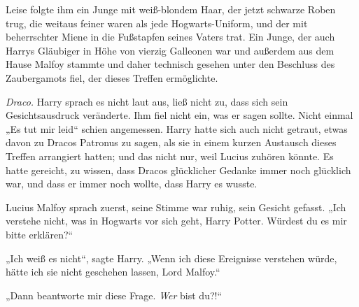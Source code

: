 Leise folgte ihm ein Junge mit weiß-blondem Haar, der jetzt schwarze Roben trug, die weitaus feiner waren als jede Hogwarts-Uniform, und der mit beherrschter Miene in die Fußstapfen seines Vaters trat. Ein Junge, der auch Harrys Gläubiger in Höhe von vierzig Galleonen war und außerdem aus dem Hause Malfoy stammte und daher technisch gesehen unter den Beschluss des Zaubergamots fiel, der dieses Treffen ermöglichte.

\emph{Draco.}
Harry sprach es nicht laut aus, ließ nicht zu, dass sich sein Gesichtsausdruck veränderte. Ihm fiel nicht ein, was er sagen sollte. Nicht einmal
„Es tut mir leid“ schien angemessen. Harry hatte sich auch nicht getraut, etwas davon zu Dracos Patronus zu sagen, als sie in einem kurzen Austausch dieses Treffen arrangiert hatten; und das nicht nur, weil Lucius zuhören könnte. Es hatte gereicht, zu wissen, dass Dracos glücklicher Gedanke immer noch glücklich war, und dass er immer noch wollte, dass Harry es wusste.

Lucius Malfoy sprach zuerst, seine Stimme war ruhig, sein Gesicht gefasst.
„Ich verstehe nicht, was in Hogwarts vor sich geht, Harry Potter. Würdest du es mir bitte erklären?“

„Ich weiß es nicht“, sagte Harry.
„Wenn ich diese Ereignisse verstehen würde, hätte ich sie nicht geschehen lassen, Lord Malfoy.“

„Dann beantworte mir diese Frage. \emph{Wer} bist du?!“

